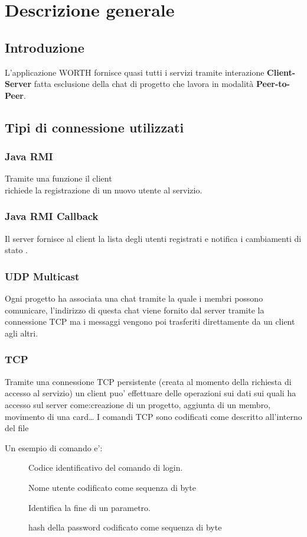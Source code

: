 \chapter*{Descrizione generale}

\section*{Introduzione}
L'applicazione WORTH fornisce quasi tutti i servizi tramite interazione \textbf{Client-Server} fatta esclusione della chat di progetto che lavora in modalità \textbf{Peer-to-Peer}.
\section*{Tipi di connessione utilizzati}
\begin{center}
\end{center}
\subsection*{Java RMI}
Tramite una funzione  il client\\ richiede la registrazione di un nuovo utente al servizio.
\subsection*{Java RMI Callback}
Il server fornisce al client la lista degli utenti registrati e notifica i cambiamenti di stato .
\subsection*{UDP Multicast}
Ogni progetto ha associata una chat tramite la quale i membri possono comunicare, l'indirizzo di questa chat viene fornito dal server tramite la connessione TCP ma i messaggi vengono poi trasferiti direttamente da un client agli altri.
\subsection*{TCP}
Tramite una connessione TCP persistente (creata al momento della richiesta di accesso al servizio) un client puo' effettuare delle operazioni sui dati sui quali ha accesso sul server come:creazione di un progetto, aggiunta di un membro, movimento di una card\dots
\newline
I comandi TCP sono codificati come descritto all'interno del file 
\begin{center}
\end{center}
Un esempio di comando e':
\begin{description}
    \item[] Codice identificativo del comando di login.
    \item[] Nome utente codificato come sequenza di byte
    \item[] Identifica la fine di un parametro.
    \item[] hash della password codificato come sequenza di byte
\end{description}
